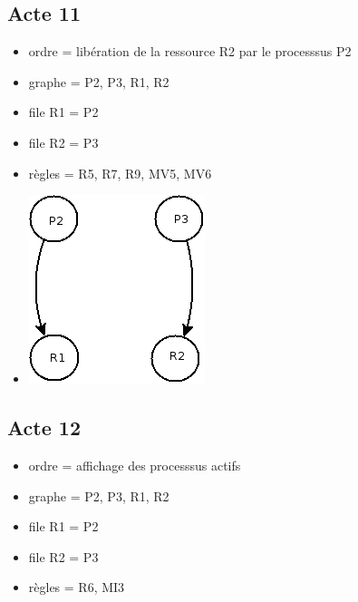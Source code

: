 \documentclass{article}
\newcommand{\bitem}{\item[\textbullet]}
\begin{document}
\subsection{Acte 11}
\begin{itemize}
  \bitem ordre = libération de la ressource R2 par le processsus P2
  \bitem graphe = P2, P3, R1, R2
  \bitem file R1 = P2
  \bitem file R2 = P3
  \bitem règles = R5, R7, R9, MV5, MV6
  \bitem \includegraphics[scale=0.5]{images/acte11}
\end{itemize}
\subsection{Acte 12}
\begin{itemize}
  \bitem ordre = affichage des processsus actifs
  \bitem graphe = P2, P3, R1, R2
  \bitem file R1 = P2
  \bitem file R2 = P3
  \bitem règles = R6, MI3
\end{itemize}
\end{document}
